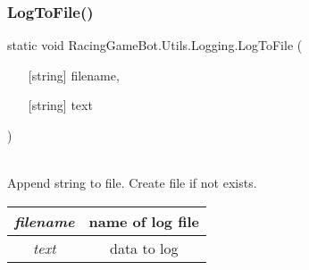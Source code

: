 \subsubsection{\texorpdfstring{LogToFile()}{LogToFile()}}
{\footnotesize\ttfamily static void RacingGameBot.Utils.Logging.LogToFile (\begin{itemize}
    \item[] [{string}]{ filename, }
    \item[] [{string}]{ text }
\end{itemize}\hspace{0.5cm})}\\
Append string to file. Create file if not exists. \\
\begin{tabular}{|c|c|}
\hline
{\em filename} & name of log file\\
\hline
{\em text} & data to log\\
\hline
\end{tabular}
